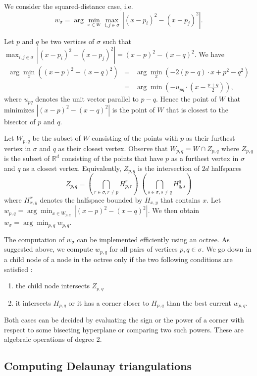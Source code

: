 \documentclass[11pt,a4paper]{article}
\newcommand{\R}{\mathbb R}
\begin{document}


We consider the squared-distance case, i.e. $$w_{\sigma}=
\arg\min_{x\in W} \max_{i,j\in \sigma}\, |(x-p_i)^2-(x-p_j)^2|.$$

Let $p$ and $q$ be two vertices of $\sigma$ such that $\max_{i,j\in
  \sigma}\, |(x-p_i)^2-(x-p_j)^2| = (x-p)^2- (x-q)^2$.
We have 
\begin{eqnarray*}
\arg\min_x ((x-p)^2- (x-q)^2) &=& \arg\min_x (-2(p-q)\cdot x
+p^2-q^2)\\
&=& \arg\min (-u_{pq}\cdot (x
-\frac{p+q}{2})),
\end{eqnarray*}
where $u_{pq}$ denotes the unit vector parallel to $p-q$.
Hence the point of $W$
that minimizes $|(x-p)^2- (x-q)^2|$ is the point of $W$ that is closest
to the bisector of $p$ and $q$.

Let $W_{p,q}$ be the subset of $W$ consisting of the points with $p$
as their furthest vertex in $\sigma$ and $q$ as their closest vertex. Observe that $W_{p,q}= W\cap Z_{p,q}$
where $Z_{p,q}$ is the subset of $\R^d$ consisting of the  points that
have $p$ as a furthest vertex in $\sigma$ and $q$ as a closest vertex.
Equivalently, $Z_{p,q}$ is the intersection of $2d$ halfspaces
\[ Z_{p,q}= \left( \bigcap_{r\in\sigma, r\neq p} H_{p,r}^r \right)
\;\left( \bigcap_
  {s\in\sigma, s\neq q} H_{q,s}^q \right) \]
where $H_{x,y}^x$ denotes the halfspace bounded by $H_{x,y}$ that
contains $x$. 
Let  $w_{p,q}= \arg\min_{x\in W_{p,q}}\, |(x-p)^2- (x-q)^2|$.
We then obtain  $w_{\sigma} =\arg\min_{p,q}w_{p,q}$.

The computation of $w_{\sigma}$ can be implemented efficiently using
an octree. 
As suggested above, we compute $w_{p,q}$ for all pairs of vertices $p,q\in \sigma$.
We go down in a child node of a node in the octree only if the two
following conditions are satisfied :
\begin{enumerate}
\item the child node intersects   $Z_{p,q}$
\item it intersects $H_{p,q}$ or it has a corner closer to $H_{p,q}$   than the best current $w_{p,q}$.
\end{enumerate}
 Both cases can be decided by evaluating the sign or the power of a corner with
 respect to some  bisecting hyperplane or comparing two such
 powers. These are algebraic operations of degree 2.


\subsection{Computing Delaunay triangulations}
\end{document}
